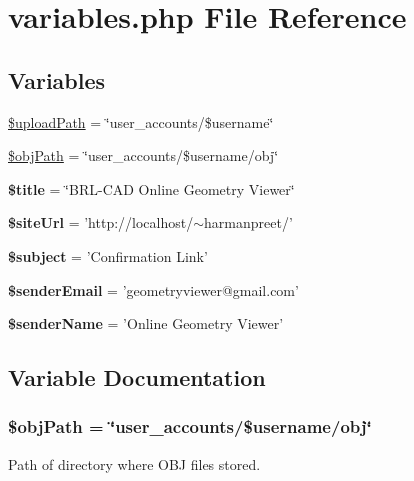 \hypertarget{variables_8php}{\section{variables.\-php File Reference}
\label{variables_8php}
}
\subsection*{Variables}
\begin{DoxyCompactItemize}
\item 
\hyperlink{variables_8php_a9b2aca73038168dc85a3fb6d6af948a8}{\$upload\-Path} = \char`\"{}user\-\_\-accounts/\$username\char`\"{}
\item 
\hyperlink{variables_8php_a107cb3732c3eb625a67c9896596c6c74}{\$obj\-Path} = \char`\"{}user\-\_\-accounts/\$username/obj\char`\"{}
\item 
\hypertarget{variables_8php_ada57e7bb7c152edad18fe2f166188691}{{\bfseries \$title} = \char`\"{}B\-R\-L-\/C\-A\-D Online Geometry Viewer\char`\"{}}\label{variables_8php_ada57e7bb7c152edad18fe2f166188691}

\item 
\hypertarget{variables_8php_a249f6872029172ca47702c3b887aed34}{{\bfseries \$site\-Url} = 'http\-://localhost/$\sim$harmanpreet/'}\label{variables_8php_a249f6872029172ca47702c3b887aed34}

\item 
\hypertarget{variables_8php_afea90503726cd5ad2eb80baf0b6d217d}{{\bfseries \$subject} = 'Confirmation Link'}\label{variables_8php_afea90503726cd5ad2eb80baf0b6d217d}

\item 
\hypertarget{variables_8php_a540edc1edfa3f436b0f805125e69d1fa}{{\bfseries \$sender\-Email} = 'geometryviewer@gmail.\-com'}\label{variables_8php_a540edc1edfa3f436b0f805125e69d1fa}

\item 
\hypertarget{variables_8php_ac99178d2fd94439629e08538fd8d7e4d}{{\bfseries \$sender\-Name} = 'Online Geometry Viewer'}\label{variables_8php_ac99178d2fd94439629e08538fd8d7e4d}

\end{DoxyCompactItemize}


\subsection{Variable Documentation}
\hypertarget{variables_8php_a107cb3732c3eb625a67c9896596c6c74}{
\subsubsection[{\$obj\-Path}]{\setlength{\rightskip}{0pt plus 5cm}\$obj\-Path = \char`\"{}user\-\_\-accounts/\$username/obj\char`\"{}}}\label{variables_8php_a107cb3732c3eb625a67c9896596c6c74}
Path of directory where O\-B\-J files stored. 

